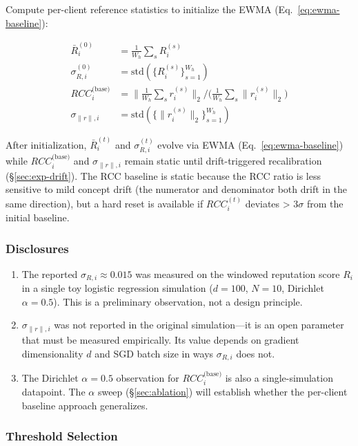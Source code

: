 \documentclass[10pt,journal]{IEEEtran}
\begin{document}
Compute per-client reference statistics to initialize the EWMA (Eq.~\ref{eq:ewma-baseline}):

\begin{align}
\bar{R}_i^{(0)} &= \textstyle\frac{1}{W_h} \sum_s R_i^{(s)} \label{eq:r-mean}\\
\sigma_{R,i}^{(0)} &= \text{std}(\{R_i^{(s)}\}_{s=1}^{W_h}) \label{eq:r-std}\\
RCC_i^{\text{(base)}} &= \textstyle \bigl\| \frac{1}{W_h} \sum_s r_i^{(s)} \bigr\|_2 \big/ \bigl( \frac{1}{W_h} \sum_s \|r_i^{(s)}\|_2 \bigr) \label{eq:rcc-base}\\
\sigma_{\|r\|,i} &= \text{std}(\{\|r_i^{(s)}\|_2\}_{s=1}^{W_h}) \label{eq:rnorm-std}
\end{align}

After initialization, $\bar{R}_i^{(t)}$ and $\sigma_{R,i}^{(t)}$ evolve via EWMA (Eq.~\ref{eq:ewma-baseline}) while $RCC_i^{\text{(base)}}$ and $\sigma_{\|r\|,i}$ remain static until drift-triggered recalibration (\S\ref{sec:exp-drift}). The RCC baseline is static because the RCC ratio is less sensitive to mild concept drift (the numerator and denominator both drift in the same direction), but a hard reset is available if $RCC_i^{(t)}$ deviates > 3$\sigma$ from the initial baseline.

\subsubsection{Disclosures}

\begin{enumerate}
  \item The reported $\sigma_{R,i} \approx 0.015$ was measured on the windowed reputation score $R_i$ in a single toy logistic regression simulation ($d=100$, $N=10$, Dirichlet $\alpha=0.5$). This is a preliminary observation, not a design principle.
  \item $\sigma_{\|r\|,i}$ was not reported in the original simulation---it is an open parameter that must be measured empirically. Its value depends on gradient dimensionality $d$ and SGD batch size in ways $\sigma_{R,i}$ does not.
  \item The Dirichlet $\alpha=0.5$ observation for $RCC_i^{\text{(base)}}$ is also a single-simulation datapoint. The $\alpha$ sweep (\S\ref{sec:ablation}) will establish whether the per-client baseline approach generalizes.
\end{enumerate}

\subsubsection{Threshold Selection}
\end{document}
